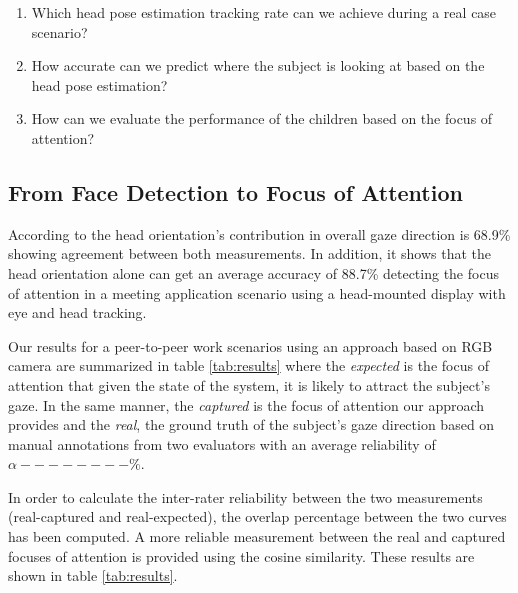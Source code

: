 \documentclass{sig-alternate}
\begin{document}
\begin{enumerate}
\item Which head pose estimation tracking rate can we achieve during a real case scenario?  
\item How accurate can we predict where the subject is looking at based on the head pose estimation?
\item How can we evaluate the performance of the children based on the focus of attention?
\end{enumerate}


\subsection{From Face Detection to Focus of Attention}

According to \cite{stiefelhagen2002tracking} the head orientation's contribution in overall gaze direction is 68.9\% showing agreement between both measurements. In addition, it shows that the head orientation alone can get an average accuracy of 88.7\% detecting the focus of attention in a meeting application scenario using a head-mounted display with eye and head tracking.

Our results for a peer-to-peer work scenarios using an approach based on RGB camera are summarized in table \ref{tab:results} where the \textit{expected} is the focus of attention that given the state of the system, it is likely to attract the subject's gaze. In the same manner, the \textit{captured} is the focus of attention our approach provides and the \textit{real}, the ground truth of the subject's gaze direction based on manual annotations from two evaluators with an average reliability of $ \alpha--------\% $.

In order to calculate the inter-rater reliability between the two measurements (real-captured and real-expected), the overlap percentage between the two curves has been computed. A more reliable measurement between the real and captured focuses of attention is provided using the cosine similarity. These results are shown in table \ref{tab:results}. 
\end{document}
